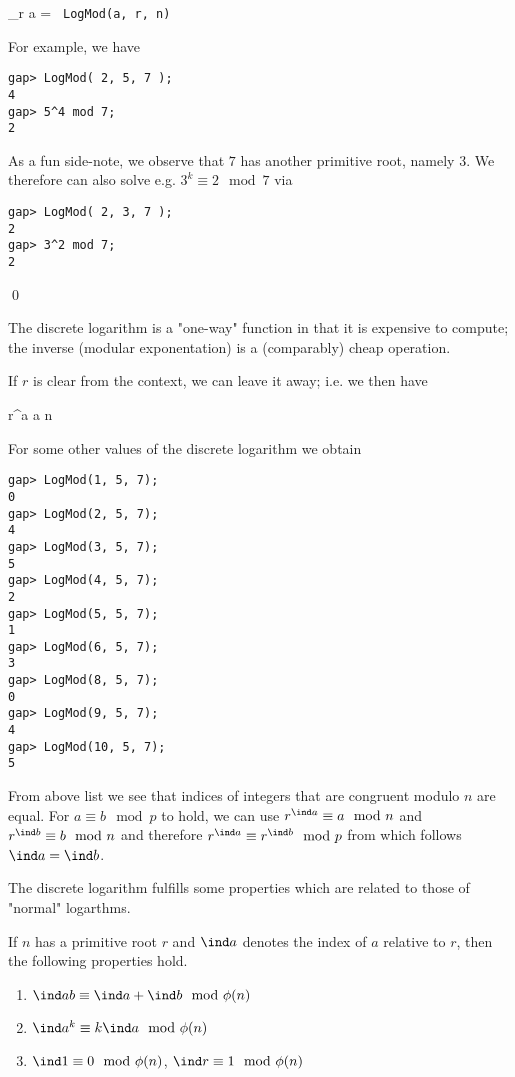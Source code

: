 \bee
  \ind_r a = \verb+ LogMod(a, r, n) +
\eee

For example, we have

\begin{verbatim}
gap> LogMod( 2, 5, 7 );
4
gap> 5^4 mod 7;
2
\end{verbatim}

As a fun side-note, we observe that $7$ has another primitive root, namely $3$. We therefore can also solve e.g. $3^k \equiv 2 \mod 7$ via

\begin{verbatim}
gap> LogMod( 2, 3, 7 );
2
gap> 3^2 mod 7;
2
\end{verbatim}

\qed

The discrete logarithm is a "one-way" function in that it is expensive to compute; the inverse (modular exponentation) is a (comparably) cheap operation.

If $r$ is clear from the context, we can leave it away; i.e. we then have

\bee
r^{\ind a} \equiv a \mod n
\eee

For some other values of the discrete logarithm we obtain

\begin{verbatim}
gap> LogMod(1, 5, 7);
0
gap> LogMod(2, 5, 7);
4
gap> LogMod(3, 5, 7);
5
gap> LogMod(4, 5, 7);
2
gap> LogMod(5, 5, 7);
1
gap> LogMod(6, 5, 7);
3
gap> LogMod(8, 5, 7);
0
gap> LogMod(9, 5, 7);
4
gap> LogMod(10, 5, 7);
5
\end{verbatim}

From above list  we see that indices of integers that are congruent modulo $n$ are equal. For $a \equiv b \mod p$ to hold, we can use $r^{\ind a} \equiv a \mod n$ and $r^{\ind b} \equiv b \mod n$ and therefore $r^{\ind a} \equiv r^{\ind b} \mod p$ from which follows $\ind a = \ind b$.


The discrete logarithm fulfills some properties which are related to those of "normal" logarthms.

\begin{theorem}
  If $n$ has a primitive root $r$ and $\ind a $ denotes the index of $a$ relative to $r$, then the following properties hold.

  \begin{enumerate}
    \item $\ind ab \equiv \ind a + \ind b \mod \phi(n)$
    \item $\ind a^k \equiv k \ind a \mod \phi(n)$
    \item $\ind 1 \equiv 0 \mod \phi(n)$, $\ind r \equiv 1 \mod \phi(n)$
  \end{enumerate}

\end{theorem}

